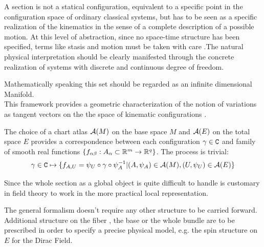 \documentclass[Main]{subfiles}
\begin{document}
	A section is not a statical configuration, equivalent to a specific point in the configuration space of ordinary classical systems, but has to be seen as a specific realization of the kinematics in the sense of  a complete description of a possible motion.
	At this level of abstraction, since no space-time structure has been specified, terms like stasis and motion must be taken with care .The natural physical interpretation should be clearly manifested through the concrete realization of systems with discrete and continuous degree of freedom.
	
	\begin{observation}
	Mathematically speaking this set should be regarded as an infinite dimensional Manifold. 
	\\
	This framework provides a geometric characterization of the notion of variations as tangent vectors on the the space of kinematic configurations .\cite{Forger2005}
	\end{observation}
	
	\begin{observation}
	The choice of a chart atlas $\mathcal{A}(M)$ on the base space $M$ and $\mathcal{A}(E)$ on the total space $E$ provides a correspondence between each configuration $\gamma \in \mathtt{C}$ and family of smooth real functions $\{f_{\alpha \beta}:A_\alpha \subset \mathbb{R}^m \rightarrow \mathbb{R}^q \}$.
	The process is trivial:
	\begin{displaymath}
		\gamma \in \mathtt{C} \mapsto \{f_{A,U}=\psi_U \circ \gamma \circ \psi_A^{-1} \vert (A,\psi_A) \in \mathcal{A}(M), (U,\psi_U)\in \mathcal{A}(E)   \}
	\end{displaymath}
	

	Since the whole section as a global object is quite difficult to handle is customary in field theory to work in the more practical local representation. 
	\end{observation}	
	
	\begin{observation}
	 	The general formalism doesn't require any other structure to be carried forward.
	 	Additional structure on the fiber , the base or the whole bundle are to be prescribed in order to specify a precise physical model, e.g. the spin structure on $E$ for the Dirac Field.\cite{Benini}
	 \end{observation}	
	
\end{document}
